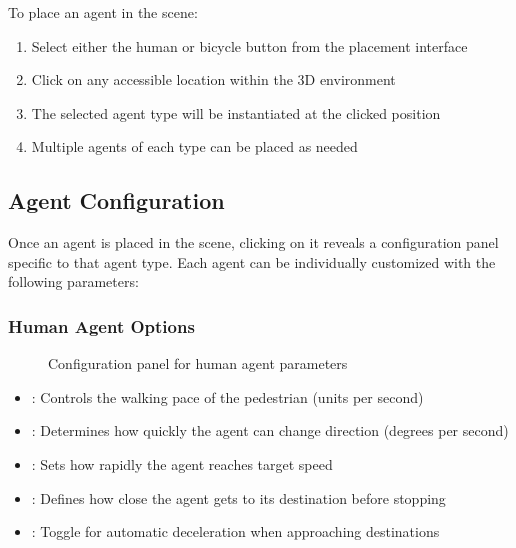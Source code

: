 \documentclass[letterpaper,10pt,english]{jupyterBook}
\begin{document}
\sphinxAtStartPar
To place an agent in the scene:
\begin{enumerate}
%
\item {} 
\sphinxAtStartPar
Select either the human or bicycle button from the placement interface

\item {} 
\sphinxAtStartPar
Click on any accessible location within the 3D environment

\item {} 
\sphinxAtStartPar
The selected agent type will be instantiated at the clicked position

\item {} 
\sphinxAtStartPar
Multiple agents of each type can be placed as needed

\end{enumerate}


\subsection{Agent Configuration}
\label{\detokenize{The Simulation:agent-configuration}}
\sphinxAtStartPar
Once an agent is placed in the scene, clicking on it reveals a configuration panel specific to that agent type. Each agent can be individually customized with the following parameters:


\subsubsection{Human Agent Options}
\label{\detokenize{The Simulation:human-agent-options}}
\begin{figure}[htbp]
\centering
\capstart

\noindent{}
\caption{Configuration panel for human agent parameters}\label{\detokenize{The Simulation:human-options-panel}}\end{figure}
\begin{itemize}
\item {} 
\sphinxAtStartPar
{}: Controls the walking pace of the pedestrian (units per second)

\item {} 
\sphinxAtStartPar
{}: Determines how quickly the agent can change direction (degrees per second)

\item {} 
\sphinxAtStartPar
{}: Sets how rapidly the agent reaches target speed

\item {} 
\sphinxAtStartPar
{}: Defines how close the agent gets to its destination before stopping

\item {} 
\sphinxAtStartPar
{}: Toggle for automatic deceleration when approaching destinations

\end{itemize}
\end{document}
